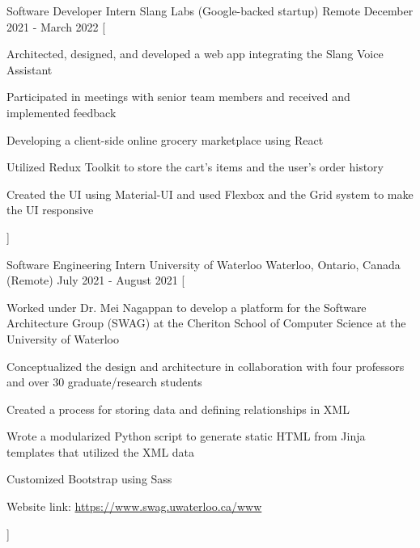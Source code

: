 

\begin{cventries}

  \cventry
    {Software Developer Intern} %
    {Slang Labs (Google-backed startup)} %
    {Remote} %
    {December 2021 - March 2022} %
    [
      \begin{cvitems} %
        \item {Architected, designed, and developed a web app integrating the Slang Voice Assistant}
        \item {Participated in meetings with senior team members and received and implemented feedback}
        \item {Developing a client-side online grocery marketplace using React}
        \item {Utilized Redux Toolkit to store the cart's items and the user's order history}
        \item {Created the UI using Material-UI and used Flexbox and the Grid system to make the UI responsive}
      \end{cvitems}
    ]

  \cventry
    {Software Engineering Intern} %
    {University of Waterloo} %
    {Waterloo, Ontario, Canada (Remote)} %
    {July 2021 - August 2021} %
    [
      \begin{cvitems} %
        \item {Worked under Dr. Mei Nagappan to develop a platform for the Software Architecture Group (SWAG) at the Cheriton School of Computer Science at the University of Waterloo}
        \item {Conceptualized the design and architecture in collaboration with four professors and over 30 graduate/research students}
        \item {Created a process for storing data and defining relationships in XML}
        \item {Wrote a modularized Python script to generate static HTML from Jinja templates that utilized the XML data}
        \item {Customized Bootstrap using Sass}
        \item {Website link: \href{https://www.swag.uwaterloo.ca/www}{https://www.swag.uwaterloo.ca/www}}
      \end{cvitems}
    ]


\end{cventries}
